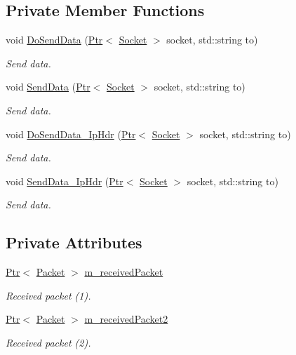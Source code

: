 \subsection*{Private Member Functions}
\begin{DoxyCompactItemize}
\item 
void \hyperlink{classIpv4RawSocketImplTest_a664d6144d25d6c91322d0ef354d9609e}{Do\+Send\+Data} (\hyperlink{classns3_1_1Ptr}{Ptr}$<$ \hyperlink{classns3_1_1Socket}{Socket} $>$ socket, std\+::string to)
\begin{DoxyCompactList}\small\item\em Send data. \end{DoxyCompactList}\item 
void \hyperlink{classIpv4RawSocketImplTest_a62c6104203d0fb2f7688ac216f0d5218}{Send\+Data} (\hyperlink{classns3_1_1Ptr}{Ptr}$<$ \hyperlink{classns3_1_1Socket}{Socket} $>$ socket, std\+::string to)
\begin{DoxyCompactList}\small\item\em Send data. \end{DoxyCompactList}\item 
void \hyperlink{classIpv4RawSocketImplTest_a94bfd4cdde1004ff32b3ac02c31703ef}{Do\+Send\+Data\+\_\+\+Ip\+Hdr} (\hyperlink{classns3_1_1Ptr}{Ptr}$<$ \hyperlink{classns3_1_1Socket}{Socket} $>$ socket, std\+::string to)
\begin{DoxyCompactList}\small\item\em Send data. \end{DoxyCompactList}\item 
void \hyperlink{classIpv4RawSocketImplTest_a251c3a3b11ab7cb4428030696cbbfc20}{Send\+Data\+\_\+\+Ip\+Hdr} (\hyperlink{classns3_1_1Ptr}{Ptr}$<$ \hyperlink{classns3_1_1Socket}{Socket} $>$ socket, std\+::string to)
\begin{DoxyCompactList}\small\item\em Send data. \end{DoxyCompactList}\end{DoxyCompactItemize}
\subsection*{Private Attributes}
\begin{DoxyCompactItemize}
\item 
\hyperlink{classns3_1_1Ptr}{Ptr}$<$ \hyperlink{classns3_1_1Packet}{Packet} $>$ \hyperlink{classIpv4RawSocketImplTest_a38dee32030c77d03c740508d0a68bd22}{m\+\_\+received\+Packet}
\begin{DoxyCompactList}\small\item\em Received packet (1). \end{DoxyCompactList}\item 
\hyperlink{classns3_1_1Ptr}{Ptr}$<$ \hyperlink{classns3_1_1Packet}{Packet} $>$ \hyperlink{classIpv4RawSocketImplTest_a52607bc760ccb25a084978830b95d162}{m\+\_\+received\+Packet2}
\begin{DoxyCompactList}\small\item\em Received packet (2). \end{DoxyCompactList}\end{DoxyCompactItemize}
